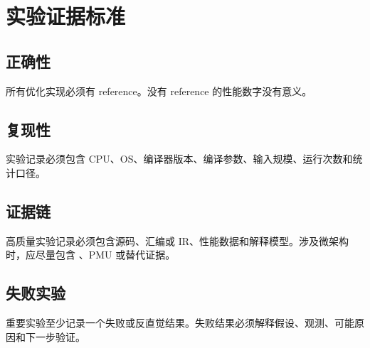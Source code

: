 \chapter{实验证据标准}

\section{正确性}

所有优化实现必须有 reference。没有 reference 的性能数字没有意义。

\section{复现性}

实验记录必须包含 CPU、OS、编译器版本、编译参数、输入规模、运行次数和统计口径。

\section{证据链}

高质量实验记录必须包含源码、汇编或 IR、性能数据和解释模型。涉及微架构时，应尽量包含 、PMU 或替代证据。

\section{失败实验}

重要实验至少记录一个失败或反直觉结果。失败结果必须解释假设、观测、可能原因和下一步验证。
